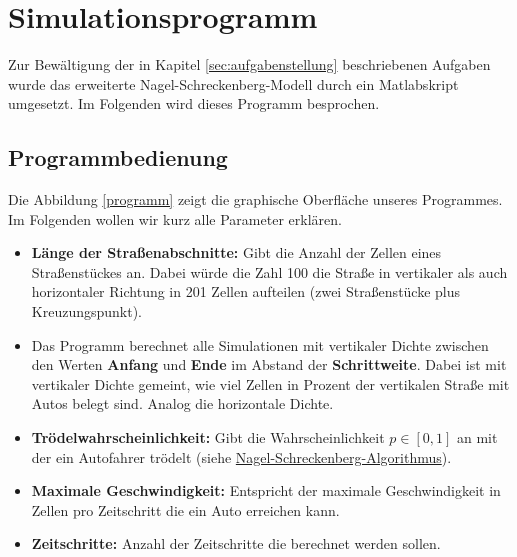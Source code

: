 \chapter{Simulationsprogramm}\label{chap3}
Zur Bewältigung der in Kapitel \ref{sec:aufgabenstellung} beschriebenen
Aufgaben wurde das erweiterte Nagel-Schreckenberg-Modell 
durch ein Matlabskript umgesetzt. Im Folgenden wird dieses Programm besprochen.

\section{Programmbedienung}
Die Abbildung \ref{programm} zeigt die graphische Oberfläche unseres Programmes. Im Folgenden wollen wir kurz alle Parameter erklären.
\begin{itemize}
\item[] \textbf{Länge der Straßenabschnitte:} Gibt die Anzahl der Zellen eines Straßenstückes an. Dabei würde die Zahl 100 die Straße in vertikaler als auch horizontaler Richtung in 201 Zellen aufteilen (zwei Straßenstücke plus Kreuzungspunkt).
\item[] Das Programm berechnet alle Simulationen mit vertikaler Dichte zwischen den Werten \textbf{Anfang} und \textbf{Ende} im Abstand der \textbf{Schrittweite}. Dabei ist mit vertikaler Dichte gemeint, wie viel Zellen in Prozent der vertikalen Straße mit Autos belegt sind. Analog die horizontale Dichte.
\item[] \textbf{Trödelwahrscheinlichkeit:} Gibt die Wahrscheinlichkeit $p \in [0,1]$ an mit der ein Autofahrer trödelt (siehe \hyperref[nagelschreckenberg_algo]{Nagel-Schreckenberg-Algorithmus}).
\item[] \textbf{Maximale Geschwindigkeit:} Entspricht der maximale Geschwindigkeit in Zellen pro Zeitschritt die ein Auto erreichen kann. 
\item[] \textbf{Zeitschritte:} Anzahl der Zeitschritte die berechnet werden sollen.
\end{itemize}

